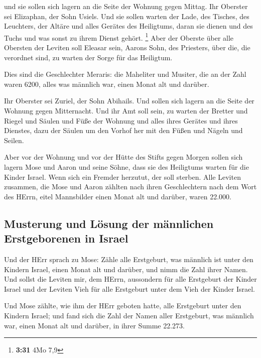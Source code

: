  und sie sollen sich lagern an die Seite der Wohnung
gegen Mittag.  Ihr Oberster sei Elizaphan, der Sohn
Usiels.  Und sie sollen warten der Lade, des Tisches, des
Leuchters, der Altäre und alles Gerätes des Heiligtums, daran sie dienen
und des Tuchs und was sonst zu ihrem Dienst gehört. \footnote{\textbf{3:31}
  4Mo 7,9}  Aber der Oberste über alle Obersten der
Leviten soll Eleasar sein, Aarons Sohn, des Priesters, über die, die
verordnet sind, zu warten der Sorge für das Heiligtum.

 Dies sind die Geschlechter Meraris: die Maheliter und
Musiter,  die an der Zahl waren 6200, alles was männlich
war, einen Monat alt und darüber.

 Ihr Oberster sei Zuriel, der Sohn Abihails. Und sollen
sich lagern an die Seite der Wohnung gegen Mitternacht. 
Und ihr Amt soll sein, zu warten der Bretter und Riegel und Säulen und
Füße der Wohnung und alles ihres Gerätes und ihres Dienstes,
 dazu der Säulen um den Vorhof her mit den Füßen und
Nägeln und Seilen.

 Aber vor der Wohnung und vor der Hütte des Stifts gegen
Morgen sollen sich lagern Mose und Aaron und seine Söhne, dass sie des
Heiligtums warten für die Kinder Israel. Wenn sich ein Fremder herzutut,
der soll sterben.  Alle Leviten zusammen, die Mose und
Aaron zählten nach ihren Geschlechtern nach dem Wort des HErrn, eitel
Mannsbilder einen Monat alt und darüber, waren 22.000.

\hypertarget{musterung-und-luxf6sung-der-muxe4nnlichen-erstgeborenen-in-israel}{%
\subsection{Musterung und Lösung der männlichen Erstgeborenen in
Israel}\label{musterung-und-luxf6sung-der-muxe4nnlichen-erstgeborenen-in-israel}}

 Und der HErr sprach zu Mose: Zähle alle Erstgeburt, was
männlich ist unter den Kindern Israel, einen Monat alt und darüber, und
nimm die Zahl ihrer Namen.  Und sollst die Leviten mir,
dem HErrn, aussondern für alle Erstgeburt der Kinder Israel und der
Leviten Vieh für alle Erstgeburt unter dem Vieh der Kinder Israel.

 Und Mose zählte, wie ihm der HErr geboten hatte, alle
Erstgeburt unter den Kindern Israel;  und fand sich die
Zahl der Namen aller Erstgeburt, was männlich war, einen Monat alt und
darüber, in ihrer Summe 22.273.

